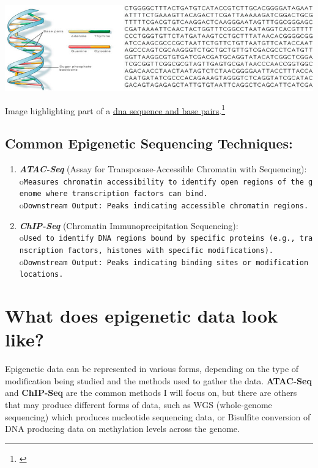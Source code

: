 \documentclass[
]{book}
\begin{document}
\includegraphics{images/dna_sequence.png}

Image highlighting part of a \href{https://www.researchgate.net/profile/Pratik-Kanani/publication/341901570/figure/fig1/AS:898621708984321@1591259519483/A-human-DNA-and-Part-of-DNA-sequence-28-29.jpg}{dna sequence and base pairs}.\footnote{\citet{kanani2020}}

\subsection{Common Epigenetic Sequencing Techniques:}\label{common-epigenetic-sequencing-techniques}

\begin{enumerate}
\def\labelenumi{\arabic{enumi}.}
\item
  \textbf{\emph{ATAC-Seq}} (Assay for Transposase-Accessible Chromatin with Sequencing):
  o\texttt{Measures\ chromatin\ accessibility\ to\ identify\ open\ regions\ of\ the\ genome\ where\ transcription\ factors\ can\ bind.}
  o\texttt{Downstream\ Output:\ Peaks\ indicating\ accessible\ chromatin\ regions.}
\item
  \textbf{\emph{ChIP-Seq}} (Chromatin Immunoprecipitation Sequencing):
  o\texttt{Used\ to\ identify\ DNA\ regions\ bound\ by\ specific\ proteins\ (e.g.,\ transcription\ factors,\ histones\ with\ specific\ modifications).}
  o\texttt{Downstream\ Output:\ Peaks\ indicating\ binding\ sites\ or\ modification\ locations.}
\end{enumerate}

\section{What does epigenetic data look like?}\label{what-does-epigenetic-data-look-like}

Epigenetic data can be represented in various forms, depending on the type of modification being studied and the methods used to gather the data. \textbf{ATAC-Seq} and \textbf{ChIP-Seq} are the common methods I will focus on, but there are others that may produce different forms of data, such as WGS (whole-genome sequencing) which produces nucleotide sequencing data, or Bisulfite conversion of DNA producing data on methylation levels across the genome.
\end{document}
